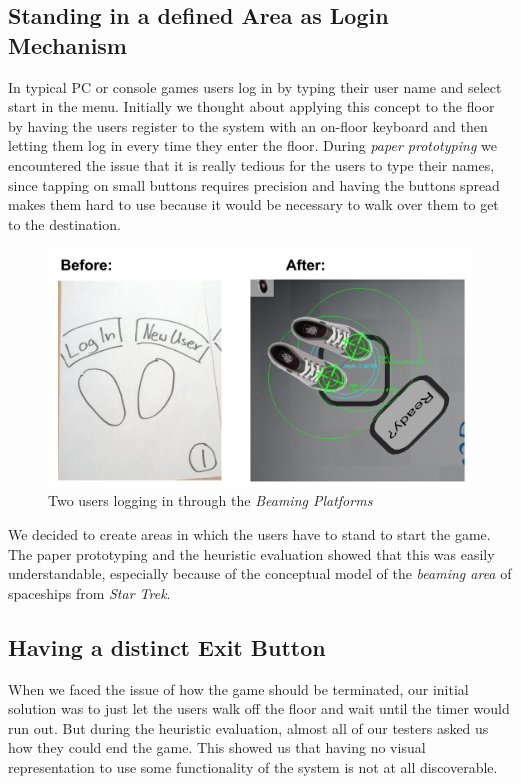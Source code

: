 \documentclass{sigchi}
\begin{document}
\subsection{Standing in a defined Area as Login Mechanism}
\vspace{1mm}
In typical PC or console games users log in by typing their user name and select start in the menu. Initially we thought about applying this concept to the floor by having the users register to the system with an on-floor keyboard and then letting them log in every time they enter the floor. During \textit{paper prototyping} we encountered the issue that it is really tedious for the users to type their names, since tapping on small buttons requires precision and having the buttons spread makes them hard to use because it would be necessary to walk over them to get to the destination. 
\begin{figure}[H]
\centering
\includegraphics[width=0.99\columnwidth]{loginarea}
\caption{Two users logging in through the \textit{Beaming Platforms}}
\label{fig:beamingArea}
\end{figure}
We decided to create areas in which the users have to stand to start the game. The paper prototyping and the heuristic evaluation showed that this was easily understandable, especially because of the conceptual model of the \textit{beaming area} of spaceships from \textit{Star Trek}. 




\subsection{Having a distinct Exit Button}
\vspace{1mm}
When we faced the issue of how the game should be terminated, our initial solution was to just let the users walk off the floor and wait until the timer would run out. But during the heuristic evaluation, almost all of our testers asked us how they could end the game. This showed us that having no visual representation to use some functionality of the system is not at all discoverable. 
\end{document}
